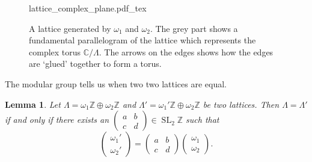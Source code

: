 \documentclass[a4paper]{article}
\newcommand{\incfig}[1]{%
	\def\svgwidth{\columnwidth}
	{#1.pdf_tex}
}
\theoremstyle{theoremdd}
\newtheorem{lemma}[theorem]{Lemma}
\theoremstyle{definitiondd}
\theoremstyle{remarkdd}
\newcommand{\Z}{\mathbb{Z}}
\newcommand{\C}{\mathbb{C}}
\DeclareMathOperator{\SL}{SL}
\begin{document}
\begin{figure}[h]
	\centering
	\incfig{lattice_complex_plane}
	\caption{A lattice generated by $\omega_1$ and $\omega_2$. The grey part shows a fundamental parallelogram of the lattice which represents the complex torus $\C / \Lambda$. The arrows on the edges shows how the edges are `glued' together to form a torus.} \label{fig:complex_torus}
\end{figure}

The modular group tells us when two two lattices are equal. 
\begin{lemma}\label{lem:equality_of_lattices}
	Let $\Lambda = \omega_1\Z \oplus \omega_2\Z$ and $\Lambda' = \omega_1'\Z \oplus \omega_2\Z$ be two lattices. 
	Then $\Lambda = \Lambda'$ if and only if there exists an $\begin{pmatrix} a & b \\ c& d \end{pmatrix} \in \SL_2\Z$ such that \[
	\begin{pmatrix} \omega_1' \\ \omega_2' \end{pmatrix}  = 
	\begin{pmatrix} a & b \\ c& d \end{pmatrix} 
	\begin{pmatrix} \omega_1 \\ \omega_2 \end{pmatrix} 
	.\] 
\end{lemma}
\end{document}
